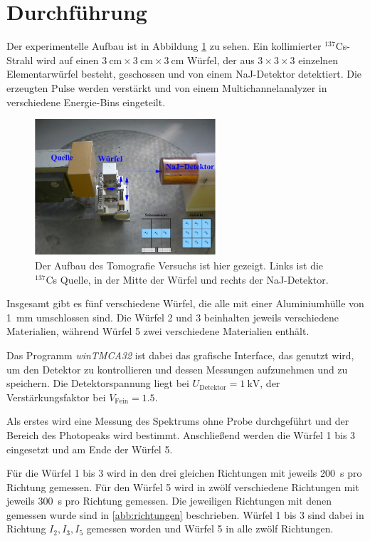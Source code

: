 \section{Durchführung}

Der experimentelle Aufbau ist in Abbildung \ref{abb:aufbau} zu sehen. Ein kollimierter $^{137}$Cs-Strahl wird auf einen $\SI{3}{\centi\meter}\times\SI{3}{\centi\meter}\times\SI{3}{\centi\meter}$ Würfel, der aus $\num{3}\times\num{3}\times\num{3}$ einzelnen Elementarwürfel besteht, geschossen und von einem NaJ-Detektor detektiert. Die erzeugten Pulse werden verstärkt und von einem Multichannelanalyzer in verschiedene Energie-Bins eingeteilt.

\begin{figure}
    \centering
    \includegraphics[width=0.6\textwidth]{figures/aufbau.jpg}
    \caption{Der Aufbau des Tomografie Versuchs ist hier gezeigt. Links ist die $^{137}$Cs Quelle, in der Mitte der Würfel und rechts der NaJ-Detektor. \cite{anleitung}}
    \label{abb:aufbau}
    \end{figure}

Insgesamt gibt es fünf verschiedene Würfel, die alle mit einer Aluminiumhülle von \SI{1}{\milli\meter} umschlossen sind. Die Würfel 2 und 3 beinhalten jeweils verschiedene Materialien, während Würfel 5 zwei verschiedene Materialien enthält. 

Das Programm \textit{winTMCA32} ist dabei das grafische Interface, das genutzt wird, um den Detektor zu kontrollieren und dessen Messungen aufzunehmen und zu speichern. 
Die Detektorspannung liegt bei $U_\text{Detektor} = \SI{1}{\kilo\volt}$, der Verstärkungsfaktor bei $V_\text{Fein}=\num{1.5}$. 

Als erstes wird eine Messung des Spektrums ohne Probe durchgeführt und der Bereich des Photopeaks wird bestimmt.  
Anschließend werden die Würfel 1 bis 3 eingesetzt und am Ende der Würfel 5. 

Für die Würfel 1 bis 3 wird in den drei gleichen Richtungen mit jeweils \SI{200}{\second} pro Richtung gemessen. 
Für den Würfel 5 wird in zwölf verschiedene Richtungen mit jeweils \SI{300}{\second} pro Richtung gemessen.
Die jeweiligen Richtungen mit denen gemessen wurde sind in \ref{abb:richtungen} beschrieben. Würfel 1 bis 3 sind dabei in Richtung $I_2, I_3, I_5$ gemessen worden und Würfel 5 in alle zwölf Richtungen. 

